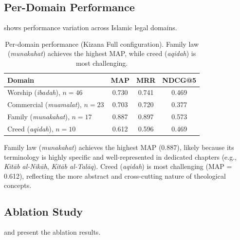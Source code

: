 \documentclass[preprint,12pt,numbers]{elsarticle}
\begin{document}
\subsection{Per-Domain Performance}

 shows performance variation across Islamic legal domains.

\begin{table}[t]
\centering
\caption{Per-domain performance (Kizana Full configuration). Family law (\textit{munakahat}) achieves the highest MAP, while creed (\textit{aqidah}) is most challenging.}
\label{tab:per-domain}
\begin{tabular}{lccc}
\toprule
Domain & MAP & MRR & NDCG@5 \\
\midrule
Worship (\textit{ibadah}), $n=46$ & 0.730 & 0.741 & 0.469 \\
Commercial (\textit{muamalat}), $n=23$ & 0.703 & 0.720 & 0.377 \\
Family (\textit{munakahat}), $n=17$ & 0.887 & 0.897 & 0.573 \\
Creed (\textit{aqidah}), $n=10$ & 0.612 & 0.596 & 0.469 \\
\bottomrule
\end{tabular}
\end{table}

Family law (\textit{munakahat}) achieves the highest MAP (0.887), likely because its terminology is highly specific and well-represented in dedicated chapters (e.g., \textit{Kit\={a}b al-Nik\={a}h}, \textit{Kit\={a}b al-Tal\={a}q}). Creed (\textit{aqidah}) is most challenging (MAP = 0.612), reflecting the more abstract and cross-cutting nature of theological concepts.

\subsection{Ablation Study}

 and  present the ablation results.
\end{document}
